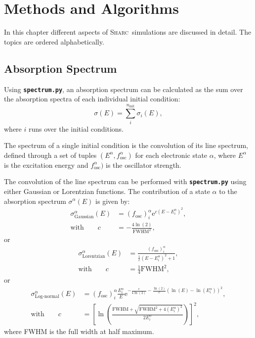 \documentclass[a4paper,10pt,DIV=15,openany]{scrbook}
\newcommand{\sharc}{\textsc{Sharc}}
\newcommand{\ttt}[1]{\textbf{\texttt{#1}}}
\newcommand{\E}{\ensuremath{\mathrm{e}}}
\begin{document}
\chapter{Methods and Algorithms}
\label{chap:met}

In this chapter different aspects of \sharc\ simulations are discussed in detail. The topics are ordered alphabetically.


\section{Absorption Spectrum}\label{met:spectrum}

Using \ttt{spectrum.py}, an absorption spectrum can be calculated as the sum over the absorption spectra of each individual initial condition:
\begin{equation}
  \sigma(E)=\sum\limits_i^{n_\text{init}} \sigma_i(E),
\end{equation}
where $i$ runs over the initial conditions.

The spectrum of a single initial condition is the convolution of its line spectrum, defined through a set of tuples $(E^\alpha,f_\text{osc}^\alpha)$ for each electronic state $\alpha$, where $E^\alpha$ is the excitation energy and $f_\text{osc}^\alpha)$ is the oscillator strength.

The convolution of the line spectrum can be performed with \ttt{spectrum.py} using either Gaussian or Lorentzian functions. The contribution of a state $\alpha$ to the absorption spectrum $\sigma^\alpha(E)$ is given by:
\begin{align}
  \sigma_{\text{Gaussian}}^\alpha(E)&=
  \left(f_{\text{osc}}\right)_i^\alpha 
  \E^{c\left(E-E_i^\alpha\right)^2},\\
  \text{with}\qquad
  c&=-\frac{4\ln(2)}{\text{FWHM}^2},
\end{align}
or
\begin{align}
  \sigma_{\text{Lorentzian}}^\alpha(E)&=
  \frac{\left(f_{\text{osc}}\right)_i^\alpha}{\frac{1}{c}\left(E-E_i^\alpha\right)^2+1},\\
  \text{with}\qquad
  c&=\frac{1}{4}\text{FWHM}^2,
\end{align}
or
\begin{align}
  \sigma_{\text{Log-normal}}^\alpha(E)&=
  \left(f_{\text{osc}}\right)_i^\alpha 
  \frac{E_i^\alpha}{E}
  \E^{-\frac{c}{4\ln(2)}-\frac{\ln(2)}{c}\left(\ln(E)-\ln(E^\alpha_i)\right)^2},\\
  \text{with}\qquad
  c&=\left[\ln\left(\frac{\text{FWHM}+\sqrt{\text{FWHM}^2+4(E^\alpha_i)^2}}{2E^\alpha_i}\right)\right]^2,
\end{align}
where FWHM is the full width at half maximum.
\end{document}
